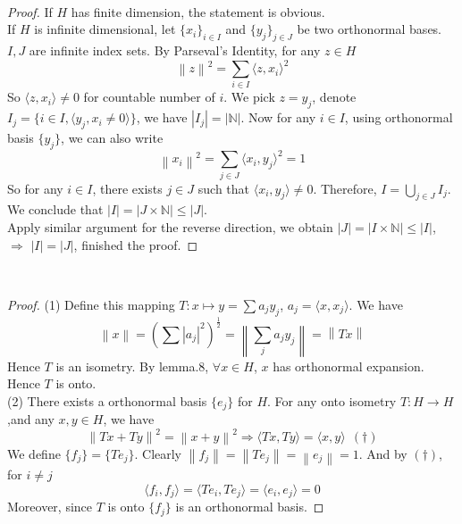 \documentclass[a4paper, 10pt]{article}
\theoremstyle{definition}
\theoremstyle{hSol}
\begin{document}
~\\

\begin{proof} If $H$ has finite dimension, the statement is obvious. \\
If $H$ is infinite dimensional, let $\{x_i\}_{i\in I}$ and $\{y_j\}_{j\in J}$ be two orthonormal bases. $I,J$ are infinite index sets. By Parseval's Identity, for any $z\in H$
\begin{equation}
	\left\|z\right\|^2 = \sum_{i\in I} \langle z, x_i \rangle^2
\end{equation}
So $\langle z,x_i \rangle\ne 0$ for countable number of $i$. We pick $z=y_j$, denote $I_j=\{i\in I, \langle y_j,x_i \ne 0\rangle\}$, we have $|I_j|=|\mathbb{N}|$. Now for any $i\in I$, using orthonormal basis $\{y_j\}$, we can also write
\begin{equation}
	\left\|x_i\right\|^2 = \sum_{j\in J} \langle x_i, y_j \rangle^2 = 1
\end{equation}
So for any $i\in I$, there exists $j\in J$ such that $\langle x_i, y_j \rangle\ne 0$. Therefore, $I=\bigcup_{j\in J}I_j$. We conclude that $|I|=|J\times\mathbb{N}|\leq |J|$. \\Apply similar argument for the reverse direction, we obtain $|J|=|I\times\mathbb{N}|\leq |I|$, $\Rightarrow$ $|I|=|J|$, finished the proof.
\end{proof}

~\\

\begin{proof} (1) Define this mapping $T: x\mapsto y = \sum a_j y_j$, $a_j=\langle x,x_j \rangle$. We have
\begin{equation}
 	\left\|x\right\| = \left(\sum |a_j|^2 \right)^{\frac{1}{2}} = \left\|\sum_j a_j y_j\right\| = \left\|Tx\right\|
\end{equation} 
Hence $T$ is an isometry. By lemma.8, $\forall x\in H$, $x$ has orthonormal expansion. Hence $T$ is onto. \\
(2) There exists a orthonormal basis $\{e_j\}$ for $H$. For any onto isometry $T: H\to H$,and any $x,y\in H$, we have
\begin{equation}
	\left\|Tx+Ty\right\|^2 = \left\|x+y\right\|^2 \Rightarrow \langle Tx, Ty \rangle = \langle x,y \rangle~~(\dag)
\end{equation}
We define $\{f_j\}=\{Te_j\}$. Clearly $\left\|f_j\right\| = \left\|Te_j\right\| = \left\|e_j\right\| = 1$. And by $(\dag)$, for $i\ne j$
\begin{equation}
	\langle f_i, f_j \rangle = \langle Te_i, Te_j \rangle = \langle e_i, e_j \rangle = 0
\end{equation}
Moreover, since $T$ is onto $\{f_j\}$ is an orthonormal basis.
\end{proof}
\end{document}

